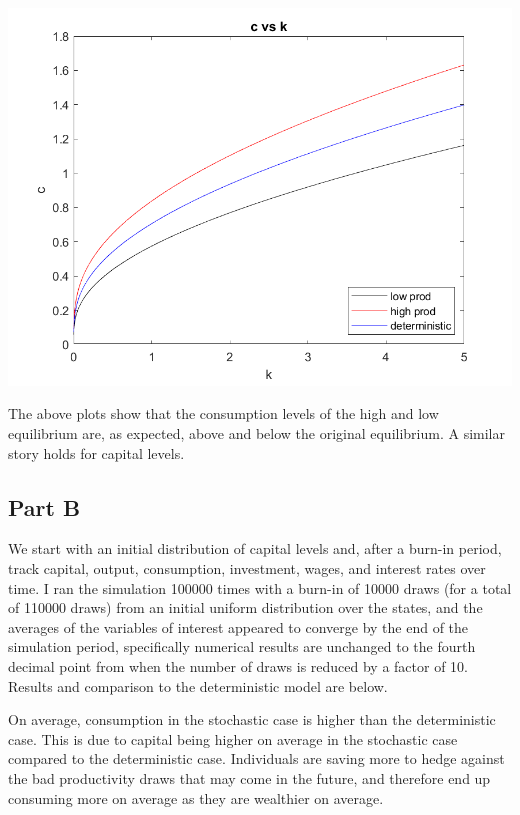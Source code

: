 \documentclass[11pt]{article} %
\begin{document}
\includegraphics{q2c}

The above plots show that the consumption levels of the high and low equilibrium are, as expected, above and below the original equilibrium. A similar story holds for capital levels.

\subsection{Part B}
We start with an initial distribution of capital levels and, after a burn-in period, track capital, output, consumption, investment, wages, and interest rates over time. I ran the simulation 100000 times with a burn-in of 10000 draws (for a total of 110000 draws) from an initial uniform distribution over the states, and the averages of the variables of interest appeared to converge by the end of the simulation period, specifically numerical results are unchanged to the fourth decimal point from when the number of draws is reduced by a factor of 10. Results and comparison to the deterministic model are below.

\begin{center}

\end{center}

On average, consumption in the stochastic case is higher than the deterministic case. This is due to capital being higher on average in the stochastic case compared to the deterministic case. Individuals are saving more to hedge against the bad productivity draws that may come in the future, and therefore end up consuming more on average as they are wealthier on average.
\end{document}
